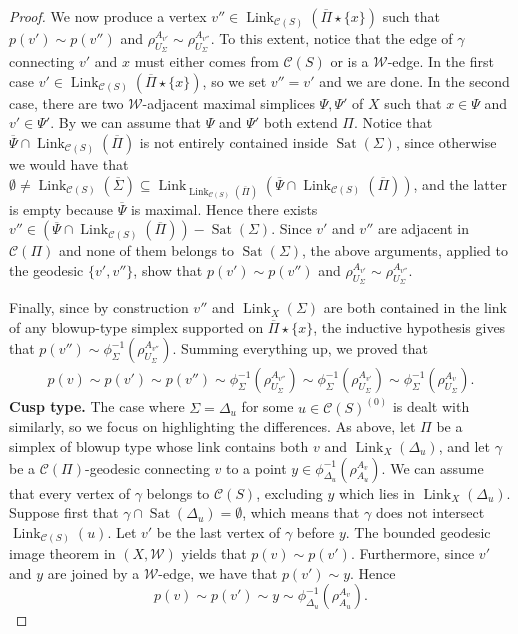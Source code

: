 \documentclass[svgnames]{amsart}
\theoremstyle{plain}
\theoremstyle{definition}
\newcommand{\C}[1]{\mathcal{C}(#1)}
\newcommand{\link}[2]{\operatorname{Link}_{#1}\left(#2\right)}
\newcommand{\W}{\mathcal{W}}
\newcommand{\Sat}{\operatorname{Sat}}
\newcommand{\ov}[1]{\overline{#1}}
\begin{document}
\begin{proof}
    We now produce a vertex $v''\in \link{\C S}{\ov \Pi\star \{x\}}$ such that $p(v')\sim p(v'')$ and $\rho^{A_{v'}}_{U_\Sigma}\sim \rho^{A_{v''}}_{U_\Sigma}$. To this extent, notice that the edge of $\gamma$ connecting $v'$ and $x$ must either comes from $\C S$ or is a $\W$-edge. In the first case $v'\in \link{\C S}{\ov \Pi\star \{x\}}$, so we set $v''=v'$ and we are done. In the second case, there are two $\W$-adjacent maximal simplices $\Psi, \Psi'$ of $X$ such that $x\in \Psi$ and $v'\in \Psi'$. By  we can assume that $\Psi$ and $\Psi'$ both extend $\Pi$. Notice that $\ov\Psi\cap \link{\C S}{\ov \Pi}$ is not entirely contained inside $\Sat(\Sigma)$, since otherwise we would have that $\emptyset \neq\link{\C S}{\ov \Sigma}\subseteq \link{\link{\C S}{\ov \Pi}}{\ov\Psi\cap \link{\C S}{\ov \Pi}}$, and the latter is empty because $\ov\Psi$ is maximal. Hence there exists $v''\in (\ov\Psi\cap \link{\C S}{\ov \Pi})-\Sat(\Sigma)$. Since $v'$ and $v''$ are adjacent in $\C{\Pi}$ and none of them belongs to $\Sat(\Sigma)$, the above arguments, applied to the geodesic $\{v',v''\}$, show that $p(v')\sim p(v'')$ and $\rho^{A_{v'}}_{U_\Sigma}\sim \rho^{A_{v''}}_{U_\Sigma}$.

    
    Finally, since by construction $v''$ and $\link{X}{\Sigma}$ are both contained in the link of any blowup-type simplex supported on $\ov\Pi\star\{x\}$, the inductive hypothesis gives that $p(v'')\sim \phi_\Sigma^{-1}\left(\rho^{A_{v''}}_{U_\Sigma}\right)$. Summing everything up, we proved that
    \begin{align*}
    p(v)\sim p(v')\sim p(v'')\sim \phi_\Sigma^{-1}\left(\rho^{A_{v''}}_{U_\Sigma}\right) \sim \phi_\Sigma^{-1}\left(\rho^{A_{v'}}_{U_\Sigma}\right)\sim \phi_{\Sigma}^{-1}\left(\rho^{A_v}_{U_\Sigma}\right).\end{align*}
    \textbf{Cusp type.} The case where $\Sigma=\Delta_u$ for some $u\in \C S^{(0)}$ is dealt with similarly, so we focus on highlighting the differences. As above, let $\Pi$ be a simplex of blowup type whose link contains both $v$ and $\link{X}{\Delta_u}$, and let $\gamma$ be a $\C\Pi$-geodesic connecting $v$ to a point $y\in \phi_{\Delta_u}^{-1}(\rho^{A_v}_{A_u})$. We can assume that every vertex of $\gamma$ belongs to $\C S$, excluding $y$ which lies in $\link{X}{\Delta_u}$. Suppose first that $\gamma\cap\Sat(\Delta_u)=\emptyset$, which means that $\gamma$ does not intersect $\link{\C S}{u}$. Let $v'$ be the last vertex of $\gamma$ before $y$. The bounded geodesic image theorem in $(X,\W)$ yields that $p(v)\sim p(v')$. Furthermore, since $v'$ and $y$ are joined by a $\W$-edge, we have that $p(v')\sim y$. Hence
    $$p(v)\sim p(v')\sim y\sim \phi_{\Delta_u}^{-1}(\rho^{A_v}_{A_u}).$$


\end{proof}
\end{document}
